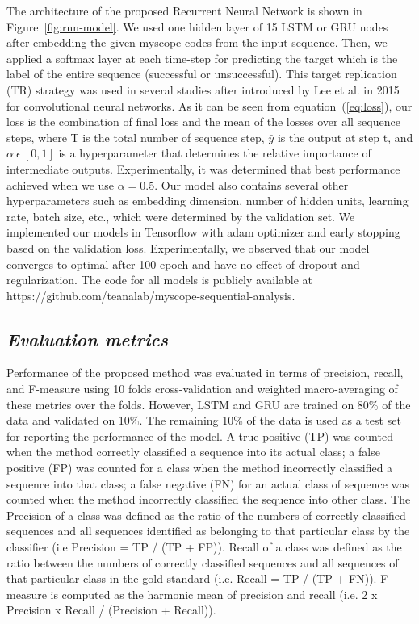 \documentclass{amia_summit_2018}
\begin{document}
The architecture of the proposed Recurrent Neural Network is shown in Figure~\ref{fig:rnn-model}. We used one hidden layer of 15 LSTM or GRU nodes after embedding the given myscope codes from the input sequence. Then, we applied a softmax layer at each time-step for predicting the target which is the label of the entire sequence (successful or unsuccessful). This target replication (TR) strategy was used in several studies \cite{lipton2015learning, choi2016doctor} after introduced by Lee et al.\cite{lee2015deeply} in 2015 for convolutional neural networks. As it can be seen from equation~(\ref{eq:loss}), our loss is the combination of final loss and the mean of the losses over all sequence steps, where T is the total number of sequence step, $\bar y$ is the output at step t, and $\alpha\ \epsilon\ [0, 1]$ is a hyperparameter that determines the relative importance of intermediate outputs. Experimentally, it was determined that best performance achieved when we use  $\alpha=0.5$. Our model also contains several other hyperparameters such as embedding dimension, number of hidden units, learning rate, batch size, etc., which were determined by the validation set. We implemented our models in Tensorflow with adam optimizer and early stopping based on the validation loss. Experimentally, we observed that our model converges to optimal after 100 epoch and have no effect of dropout and regularization. The code for all models is publicly available at https://github.com/teanalab/myscope-sequential-analysis.   
  
\subsection*{\textit{Evaluation metrics}}
Performance of the proposed method was evaluated in terms of precision, recall, and F-measure using 10 folds cross-validation and weighted macro-averaging of these metrics over the folds. However, LSTM and GRU are trained on 80\% of the data and validated on 10\%. The remaining 10\% of the data is used as a test set for reporting the performance of the model. A true positive (TP) was counted when the method correctly classified a sequence into its actual class; a false positive (FP) was counted for a class when the method incorrectly classified a sequence into that class; a false negative (FN) for an actual class of sequence was counted when the method incorrectly classified the sequence into other class. The Precision of a class was defined as the ratio of the numbers of correctly classified sequences and all sequences identified as belonging to that particular class by the classifier (i.e Precision = TP / (TP + FP)). Recall of a class was defined as the ratio between the numbers of correctly classified sequences and all sequences of that particular class in the gold standard (i.e. Recall = TP / (TP + FN)). F-measure is computed as the harmonic mean of precision and recall (i.e. 2 x Precision x Recall / (Precision + Recall)). 
\end{document}
